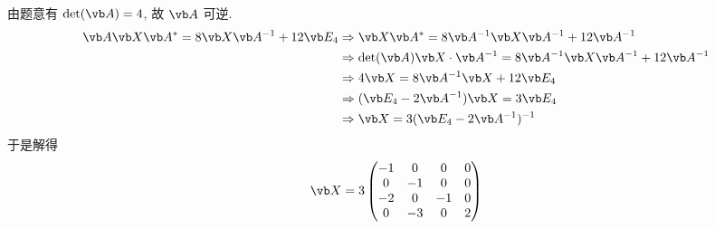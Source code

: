 由题意有 $\det(\vb A)=4$, 故 $\vb A$ 可逆.
\[
	\begin{aligned}
\vb A\vb X\vb A^*=8\vb X\vb A^{-1}+12\vb E_4&\Rightarrow \vb X\vb A^*=8\vb A^{-1}\vb X\vb A^{-1}+12\vb A^{-1}\\
&\Rightarrow \det(\vb A)\vb X\cdot \vb A^{-1}=8\vb A^{-1}\vb X\vb A^{-1}+12\vb A^{-1}\\
&\Rightarrow 4\vb X=8\vb A^{-1}\vb X+12\vb E_4\\
&\Rightarrow(\vb E_4-2\vb A^{-1})\vb X=3\vb E_4\\
&\Rightarrow \vb X=3(\vb E_4-2\vb A^{-1})^{-1}
	\end{aligned}
\]
于是解得
\[
\vb X=3\begin{pmatrix}-1&0&0&0\\ 0&-1&0&0\\ -2&0&-1&0\\ 0&-3&0&2\end{pmatrix}
\]